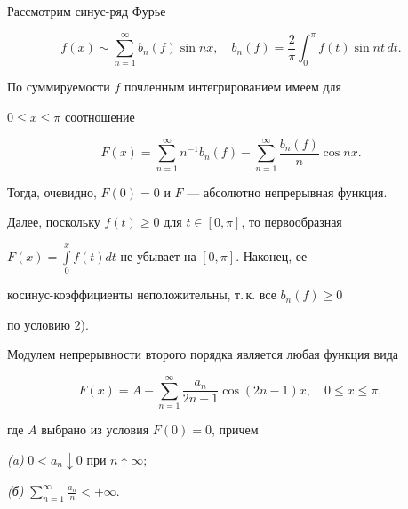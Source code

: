  


\begin{pf} 


Рассмотрим синус-ряд Фурье 


$$ 


f(x)\sim\sum^\infty_{n=1}b_n(f)\sin nx,\quad 


b_n(f)=\frac{2}{\pi}\int^\pi_0 f(t)\sin nt\,dt. 


$$ 


По суммируемости $f$ почленным интегрированием имеем для 


$0\le x\le\pi$ соотношение 


$$ 


F(x)=\sum^\infty_{n=1}n^{-1}b_n(f)-\sum^\infty_{n=1} 


\frac{b_n(f)}{n}\cos nx. 


$$ 


Тогда, очевидно, $F(0)=0$ и $F$ --- абсолютно непрерывная функция. 


Далее, поскольку $f(t)\ge 0$ для $t\in[0,\pi]$, то первообразная 


$F(x)=\int\limits^x_0 f(t)dt$ не убывает на $[0,\pi]$. Наконец, ее 


косинус-коэффициенты неположительны, т.\,к. все $b_n(f)\ge 0$ 


по условию 2). 


\end{pf} 


 


\begin{thm} 


Модулем непрерывности второго порядка является любая функция вида 


\begin{equation} 


F(x)=A-\sum^\infty_{n=1}\frac{a_n}{2n-1}\cos(2n-1)x,\quad 


0\le x\le\pi, 


\end{equation} 


где $A$ выбрано из условия $F(0)=0$, причем 


 


{\em (a)} $0<a_n\downarrow 0$ при $n\uparrow\infty;$ 


 


{\em (б)} $\sum\limits^\infty_{n=1}\frac{a_n}{n}<+\infty$. 


\end{thm} 


